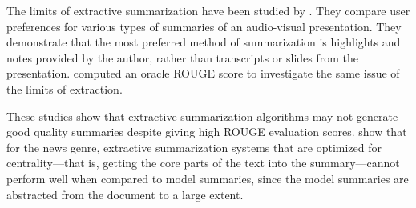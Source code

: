 The limits of extractive summarization have been studied by . They compare user preferences for various types of summaries of an audio-visual presentation. They demonstrate that the most preferred method of summarization is highlights and notes provided by the author, rather than transcripts or slides from the presentation.  computed an oracle ROUGE score to investigate the same issue of the limits of extraction. 

These studies show that extractive summarization algorithms may not generate good quality summaries despite giving high ROUGE evaluation scores.  show that for the news genre, extractive summarization systems that are optimized for centrality---that is, getting the core parts of the text into the summary---cannot perform well when compared to model summaries, since the model summaries are abstracted from the document to a large extent.
